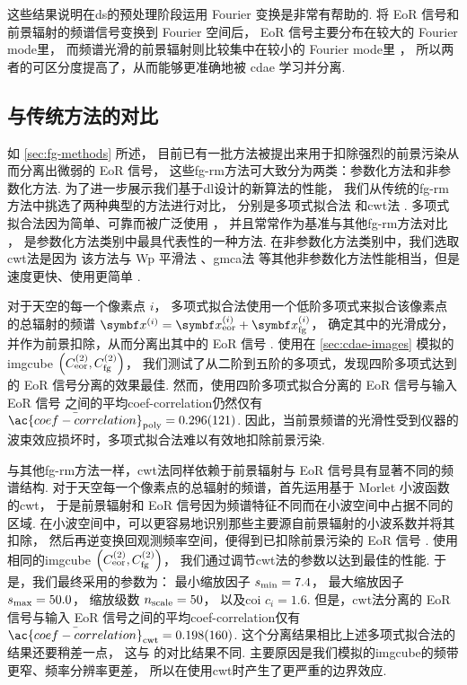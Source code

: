 这些结果说明在\ac{ds}的预处理阶段运用 Fourier 变换是非常有帮助的.
将 EoR 信号和前景辐射的频谱信号变换到 Fourier 空间后，
EoR 信号主要分布在较大的 Fourier \ac{mode}里，
而频谱光滑的前景辐射则比较集中在较小的 Fourier \ac{mode}里 \cite{parsons2012}，
所以两者的可区分度提高了，从而能够更准确地被 \ac{cdae} 学习并分离.

\subsection{与传统方法的对比}

如 \autoref{sec:fg-methods} 所述，
目前已有一批方法被提出来用于扣除强烈的前景污染从而分离出微弱的 EoR 信号，
这些\ac{fg-rm}方法可大致分为两类：参数化方法和非参数化方法.
为了进一步展示我们基于\ac{dl}设计的新算法的性能，
我们从传统的\ac{fg-rm}方法中挑选了两种典型的方法进行对比，
分别是多项式拟合法\cite{wang2006} 和\ac{cwt}法 \cite{gu2013}.
多项式拟合法因为简单、可靠而被广泛使用 \cite{jelic2008,liu2009ps,pritchard2010}，
并且常常作为基准与其他\ac{fg-rm}方法对比 \cite{harker2009,alonso2015,chapman2015}，
是参数化方法类别中最具代表性的一种方法.
在非参数化方法类别中，我们选取\ac{cwt}法是因为
该方法与 Wp 平滑法 \cite{harker2009}、\ac{gmca}法 \cite{chapman2013}
等其他非参数化方法性能相当，但是速度更快、使用更简单 \cite{gu2013,chapman2015}.

对于天空的每一个像素点 $i$，
多项式拟合法使用一个低阶多项式来拟合该像素点的总辐射的频谱
$\B{x}^{(i)} = \B{x}^{(i)}_{\R{eor}} + \B{x}^{(i)}_{\R{fg}}$，
确定其中的光滑成分，并作为前景扣除，从而分离出其中的 EoR 信号 \cite{wang2006}.
使用在 \autoref{sec:cdae-images} 模拟的\ac{imgcube}
$\left( C_{\mathrm{eor}}^{(2)}, C_{\mathrm{fg}}^{(2)} \right)$，
我们测试了从二阶到五阶的多项式，发现四阶多项式达到的 EoR 信号分离的效果最佳.
然而，使用四阶多项式拟合分离的 EoR 信号与输入 EoR 信号
之间的平均\acl{coef-correlation}仍然仅有
$\bar{\ac{coef-correlation}}_{\R{poly}} = \num{0.296 +- 0.121}$.
因此，当前景频谱的光滑性受到仪器的波束效应损坏时，多项式拟合法难以有效地扣除前景污染.

与其他\ac{fg-rm}方法一样，\ac{cwt}法同样依赖于前景辐射与 EoR 信号具有显著不同的频谱结构.
对于天空每一个像素点的总辐射的频谱，首先运用基于 Morlet 小波函数的\ac{cwt}，
于是前景辐射和 EoR 信号因为频谱特征不同而在小波空间中占据不同的区域.
在小波空间中，可以更容易地识别那些主要源自前景辐射的小波系数并将其扣除，
然后再逆变换回观测频率空间，便得到已扣除前景污染的 EoR 信号 \cite{gu2013}.
使用相同的\ac{imgcube}
$\left( C_{\mathrm{eor}}^{(2)}, C_{\mathrm{fg}}^{(2)} \right)$，
我们通过调节\ac{cwt}法的参数以达到最佳的性能.
于是，我们最终采用的参数为：
最小缩放因子 $s_{\mathrm{min}} = 7.4$，
最大缩放因子 $s_{\mathrm{max}} = 50.0$，
缩放级数 $n_{\mathrm{scale}} = 50$，
以及\ac{coi} $c_i = 1.6$.
但是，\ac{cwt}法分离的 EoR 信号与输入 EoR 信号之间的平均\acl{coef-correlation}仅有
$\bar{\ac{coef-correlation}}_{\R{cwt}} = \num{0.198 +- 0.160}$.
这个分离结果相比上述多项式拟合法的结果还要稍差一点，
这与  的对比结果不同.
主要原因是我们模拟的\ac{imgcube}的频带更窄、频率分辨率更差，
所以在使用\ac{cwt}时产生了更严重的边界效应.

